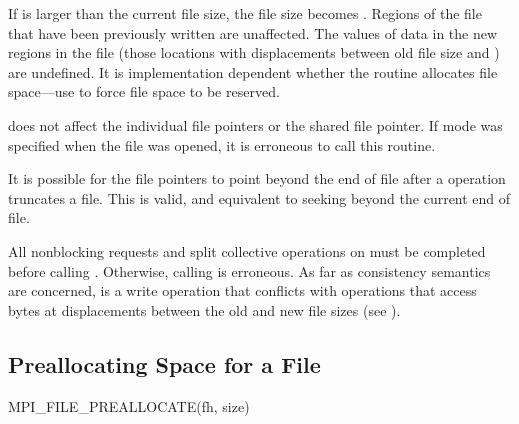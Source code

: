 If  is larger than the current file size,
the file size becomes .
Regions of the file that have been previously written are unaffected.
The values of data in the new regions in the file (those
locations with displacements between old file size and )
are undefined.
It is implementation dependent whether the  routine
allocates file space---use 
to force file space to be reserved.

 does not affect the individual file pointers
or the shared file pointer.
If  mode was specified when the file was opened,
it is erroneous to call this routine.

\begin{users}
It is possible for the file pointers to point beyond the end of file
after a  operation truncates a file.
This is valid, and equivalent to seeking beyond the current end of file.
\end{users}

All nonblocking requests
and split collective operations
on  must be completed
before calling .
Otherwise, calling  is erroneous.
As far as consistency semantics are concerned,
 is a write operation
that conflicts with operations that access bytes
at displacements between the old and new file sizes
(see ).

\subsection{Preallocating Space for a File}
\label{sec:io-filecntl-preallocate}

%
%
\begin{funcdef}{MPI\_FILE\_PREALLOCATE}{(\mbox{fh}, \mbox{size})}
\end{funcdef}

